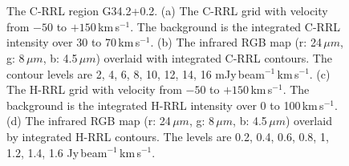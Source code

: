 \documentclass[manuscript]{aastex61}
\newcommand{\kms}{\,km\,s$^{-1}$}
\newcommand{\um}{\mu m}
\begin{document}
\begin{figure}[htbp]
\centering
{}
\\
\\ 
\caption{The C-RRL region G34.2+0.2.
          (a) The C-RRL grid with velocity from $-50$ to $+150$\kms.
	  The background is the integrated C-RRL intensity over 30 to 70\kms.
	  (b) The infrared RGB map (r: 24\,$\um$, g: 8\,$\um$, b: 4.5\,$\um$) overlaid with integrated C-RRL contours.
	  The contour levels are 2, 4, 6, 8, 10, 12, 14, 16 mJy\,beam$^{-1}$\kms.
	  (c) The H-RRL grid with velocity from $-50$ to $+150$\kms.
	  The background is the integrated H-RRL intensity over 0 to 100\kms.
	  (d) The infrared RGB map (r: 24\,$\um$, g: 8\,$\um$, b: 4.5\,$\um$) overlaid by integrated H-RRL contours.
	  The levels are 0.2, 0.4, 0.6, 0.8, 1, 1.2, 1.4, 1.6 Jy\,beam$^{-1}$\kms.
	  }
\label{fig_crrl-g342}
\end{figure}
\end{document}
